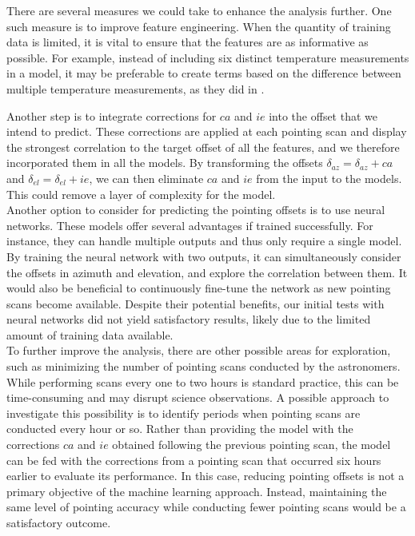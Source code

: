 There are several measures we could take to enhance the analysis further. One such measure is to improve feature engineering.
When the quantity of training data is limited, it is vital to ensure that the features are as informative as possible.
For example, instead of including six distinct temperature measurements in a model,
it may be preferable to create terms based on the difference between multiple temperature measurements, as they did in \cite{whitegreen2022}.

Another step is to integrate corrections for $ca$ and $ie$ into the offset that we intend to predict.
These corrections are applied at each pointing scan and display the strongest correlation to the target offset of all the features,
and we therefore incorporated them in all the models.
By transforming the offsets $\delta_{az}=\delta_{az} + ca$ and $\delta_{el}=\delta_{el} + ie$, we can then eliminate $ca$ and $ie$ from the input to the models.
This could remove a layer of complexity for the model.\\


Another option to consider for predicting the pointing offsets is to use neural networks.
These models offer several advantages if trained successfully.
For instance, they can handle multiple outputs and thus only require a single model.
By training the neural network with two outputs, it can simultaneously consider the offsets in azimuth and elevation, and explore the correlation between them.
It would also be beneficial to continuously fine-tune the network as new pointing scans become available.
Despite their potential benefits, our initial tests with neural networks did not yield satisfactory results,
likely due to the limited amount of training data available.\\


To further improve the analysis, there are other possible areas for exploration, such as minimizing the number of pointing scans conducted by the astronomers.
While performing scans every one to two hours is standard practice, this can be time-consuming and may disrupt science observations.
A possible approach to investigate this possibility is to identify periods when pointing scans are conducted every hour or so.
Rather than providing the model with the corrections $ca$ and $ie$ obtained following the previous pointing scan, the model can be fed with the corrections from a pointing scan that occurred six hours earlier to evaluate its performance.
In this case, reducing pointing offsets is not a primary objective of the machine learning approach.
Instead, maintaining the same level of pointing accuracy while conducting fewer pointing scans would be a satisfactory outcome.\\


